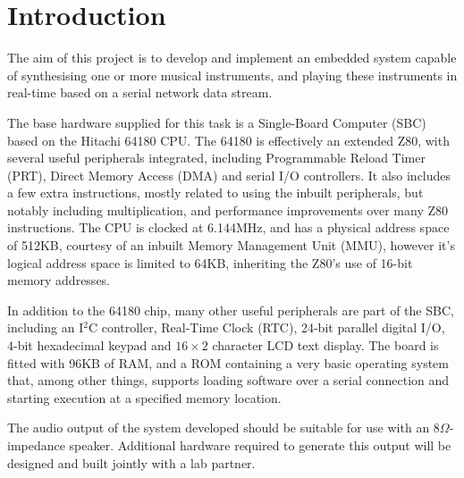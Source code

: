 \chapter{Introduction}

The aim of this project is to develop and implement an embedded system capable of synthesising one 
or more musical instruments, and playing these instruments in real-time based on a serial network 
data stream.

The base hardware supplied for this task is a Single-Board Computer (SBC) based on the Hitachi 64180 
CPU.  The 64180 is effectively an extended Z80, with several useful peripherals integrated, 
including Programmable Reload Timer (PRT), Direct Memory Access (DMA) and serial I/O controllers.  
It also includes a few extra instructions, mostly related to using the inbuilt peripherals, but 
notably including multiplication, and performance improvements over many Z80 instructions.  The CPU 
is clocked at 6.144MHz, and has a physical address space of 512KB, courtesy of an inbuilt Memory 
Management Unit (MMU), however it's logical address space is limited to 64KB, inheriting the Z80's 
use of 16-bit memory addresses.

In addition to the 64180 chip, many other useful peripherals are part of the SBC, including an 
I$^{2}$C controller, Real-Time Clock (RTC), 24-bit parallel digital I/O, 4-bit hexadecimal keypad 
and $16\times2$ character LCD text display.  The board is fitted with 96KB of RAM, and a ROM 
containing a very basic operating system that, among other things, supports loading software over a 
serial connection and starting execution at a specified memory location.

The audio output of the system developed should be suitable for use with an $8\Omega$-impedance 
speaker.  Additional hardware required to generate this output will be designed and built jointly 
with a lab partner.

